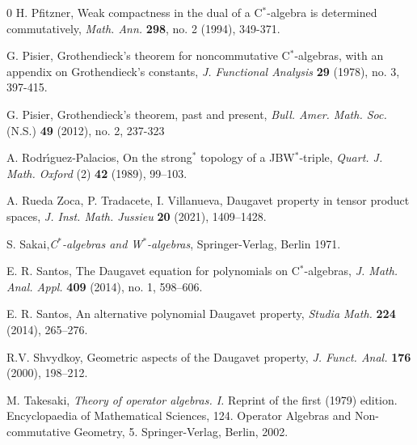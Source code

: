 \documentclass[10pt]{amsart}
\begin{document}
\begin{thebibliography}{0}
		 H. Pfitzner, Weak compactness in the dual of a C$^*$-algebra is determined commutatively, \emph{Math. Ann.} \textbf{298}, no. 2 (1994), 349-371.
		
		 G. Pisier, Grothendieck's theorem for noncommutative C$^*$-algebras, with an appendix on Grothendieck's constants, \emph{J. Functional Analysis} \textbf{29} (1978), no. 3, 397-415.
		
		 G. Pisier, Grothendieck's theorem, past and present, \emph{Bull. Amer. Math. Soc.} (N.S.) \textbf{49} (2012), no. 2, 237-323
		
		 A. Rodr\'{\i}guez-Palacios, On the strong$^*$ topology of a JBW$^*$-triple, \emph{Quart. J. Math. Oxford} (2) \textbf{42} (1989), 99--103.
		
		 A. Rueda Zoca, P. Tradacete, I. Villanueva, Daugavet property in tensor product spaces, \emph{J. Inst. Math. Jussieu} \textbf{20} (2021), 1409--1428.
		
		 S. Sakai,\emph{C$^*$-algebras and W$^*$-algebras}, Springer-Verlag, Berlin 1971.
		
		
		 E. R. Santos, The Daugavet equation for polynomials on C$^*$-algebras, \emph{J. Math. Anal. Appl.} \textbf{409} (2014), no. 1, 598--606.
		
			E. R. Santos, An alternative polynomial Daugavet property, \emph{Studia Math.} \textbf{224} (2014), 265--276.
		
		
		
		 R.V. Shvydkoy, Geometric aspects of the Daugavet property, \emph{J. Funct. Anal.} \textbf{176} (2000), 198--212.
		
		
		 M. Takesaki, \emph{Theory of operator algebras. I.} Reprint of the first (1979) edition. Encyclopaedia of Mathematical Sciences, 124. Operator Algebras and Non-commutative Geometry, 5. Springer-Verlag, Berlin, 2002.
		

\end{thebibliography}
\end{document}
